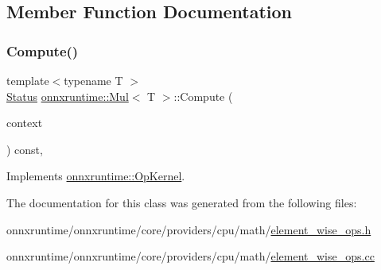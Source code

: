 \subsection{Member Function Documentation}
\mbox{\label{classonnxruntime_1_1Mul_a96178c88e54c9fa23c2c50c3cf2f82c7}} 
\subsubsection{\texorpdfstring{Compute()}{Compute()}}
{\footnotesize\ttfamily template$<$typename T $>$ \\
\mbox{\hyperlink{classonnxruntime_1_1common_1_1Status}{Status}} \mbox{\hyperlink{classonnxruntime_1_1Mul}{onnxruntime\+::\+Mul}}$<$ T $>$\+::Compute (\begin{DoxyParamCaption}\item[{\mbox{\hyperlink{classonnxruntime_1_1OpKernelContext}{Op\+Kernel\+Context}} $\ast$}]{context }\end{DoxyParamCaption}) const\hspace{0.3cm}{\ttfamily [override]}, {\ttfamily [virtual]}}



Implements \mbox{\hyperlink{classonnxruntime_1_1OpKernel_a9eca8656a78b1b3ab9d3351a12798650}{onnxruntime\+::\+Op\+Kernel}}.



The documentation for this class was generated from the following files\+:\begin{DoxyCompactItemize}
\item 
onnxruntime/onnxruntime/core/providers/cpu/math/\mbox{\hyperlink{element__wise__ops_8h}{element\+\_\+wise\+\_\+ops.\+h}}\item 
onnxruntime/onnxruntime/core/providers/cpu/math/\mbox{\hyperlink{element__wise__ops_8cc}{element\+\_\+wise\+\_\+ops.\+cc}}\end{DoxyCompactItemize}
